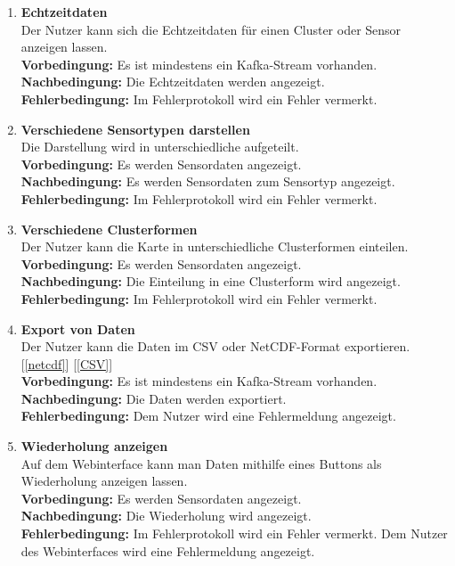 \begin{enumerate}[label=\textbf{PF\arabic{enumi}0}]
	\item \textbf{Echtzeitdaten}\\
		Der Nutzer kann sich die Echtzeitdaten für einen Cluster oder Sensor anzeigen lassen.\\
		\textbf{Vorbedingung:} Es ist mindestens ein Kafka-Stream vorhanden.\\
		\textbf{Nachbedingung:} Die Echtzeitdaten werden angezeigt.\\
		\textbf{Fehlerbedingung:} Im Fehlerprotokoll wird ein Fehler vermerkt.
	 
	 \item \textbf{Verschiedene Sensortypen darstellen}\\
	 	Die Darstellung wird in unterschiedliche  aufgeteilt.\\
	 	\textbf{Vorbedingung:} Es werden Sensordaten angezeigt.\\
	 	\textbf{Nachbedingung:} Es werden Sensordaten zum Sensortyp angezeigt.\\
	 	\textbf{Fehlerbedingung:} Im Fehlerprotokoll wird ein Fehler vermerkt.
	 
	 \item \textbf{Verschiedene Clusterformen}\\
	 	Der Nutzer kann die Karte in unterschiedliche Clusterformen einteilen.\\
	 	\textbf{Vorbedingung:} Es werden Sensordaten angezeigt.\\
	 	\textbf{Nachbedingung:} Die Einteilung in eine Clusterform wird angezeigt.\\
	 	\textbf{Fehlerbedingung:} Im Fehlerprotokoll wird ein Fehler vermerkt.
		
	\item \textbf{Export von Daten}\\
		Der Nutzer kann die Daten im CSV oder NetCDF-Format exportieren.[\ref{netcdf}] [\ref{CSV}]\\
		\textbf{Vorbedingung:} Es ist mindestens ein Kafka-Stream vorhanden.\\
		\textbf{Nachbedingung:} Die Daten werden exportiert.\\
		\textbf{Fehlerbedingung:} Dem Nutzer wird eine Fehlermeldung angezeigt.
		
	\item \textbf{Wiederholung anzeigen} \label{wiederhol}\\
		Auf dem Webinterface kann man Daten mithilfe eines Buttons als Wiederholung anzeigen lassen.\\
		\textbf{Vorbedingung:} Es werden Sensordaten angezeigt.\\
		\textbf{Nachbedingung:} Die Wiederholung wird angezeigt.\\
		\textbf{Fehlerbedingung:} Im Fehlerprotokoll wird ein Fehler vermerkt. Dem Nutzer des Webinterfaces wird eine Fehlermeldung angezeigt.


\end{enumerate}
